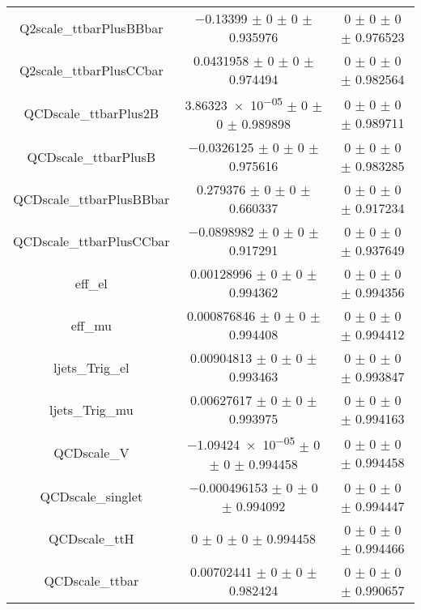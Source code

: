 \begin{table}
\begin{tabular}{ccc}
Q2scale\_ttbarPlusBBbar & \num{-0.13399} $\pm$ \num{0} $\pm$ \num{0} $\pm$ \num{0.935976} & \num{0} $\pm$ \num{0} $\pm$ \num{0} $\pm$ \num{0.976523}\\
Q2scale\_ttbarPlusCCbar & \num{0.0431958} $\pm$ \num{0} $\pm$ \num{0} $\pm$ \num{0.974494} & \num{0} $\pm$ \num{0} $\pm$ \num{0} $\pm$ \num{0.982564}\\
QCDscale\_ttbarPlus2B & \num{3.86323e-05} $\pm$ \num{0} $\pm$ \num{0} $\pm$ \num{0.989898} & \num{0} $\pm$ \num{0} $\pm$ \num{0} $\pm$ \num{0.989711}\\
QCDscale\_ttbarPlusB & \num{-0.0326125} $\pm$ \num{0} $\pm$ \num{0} $\pm$ \num{0.975616} & \num{0} $\pm$ \num{0} $\pm$ \num{0} $\pm$ \num{0.983285}\\
QCDscale\_ttbarPlusBBbar & \num{0.279376} $\pm$ \num{0} $\pm$ \num{0} $\pm$ \num{0.660337} & \num{0} $\pm$ \num{0} $\pm$ \num{0} $\pm$ \num{0.917234}\\
QCDscale\_ttbarPlusCCbar & \num{-0.0898982} $\pm$ \num{0} $\pm$ \num{0} $\pm$ \num{0.917291} & \num{0} $\pm$ \num{0} $\pm$ \num{0} $\pm$ \num{0.937649}\\
eff\_el & \num{0.00128996} $\pm$ \num{0} $\pm$ \num{0} $\pm$ \num{0.994362} & \num{0} $\pm$ \num{0} $\pm$ \num{0} $\pm$ \num{0.994356}\\
eff\_mu & \num{0.000876846} $\pm$ \num{0} $\pm$ \num{0} $\pm$ \num{0.994408} & \num{0} $\pm$ \num{0} $\pm$ \num{0} $\pm$ \num{0.994412}\\
ljets\_Trig\_el & \num{0.00904813} $\pm$ \num{0} $\pm$ \num{0} $\pm$ \num{0.993463} & \num{0} $\pm$ \num{0} $\pm$ \num{0} $\pm$ \num{0.993847}\\
ljets\_Trig\_mu & \num{0.00627617} $\pm$ \num{0} $\pm$ \num{0} $\pm$ \num{0.993975} & \num{0} $\pm$ \num{0} $\pm$ \num{0} $\pm$ \num{0.994163}\\
QCDscale\_V & \num{-1.09424e-05} $\pm$ \num{0} $\pm$ \num{0} $\pm$ \num{0.994458} & \num{0} $\pm$ \num{0} $\pm$ \num{0} $\pm$ \num{0.994458}\\
QCDscale\_singlet & \num{-0.000496153} $\pm$ \num{0} $\pm$ \num{0} $\pm$ \num{0.994092} & \num{0} $\pm$ \num{0} $\pm$ \num{0} $\pm$ \num{0.994447}\\
QCDscale\_ttH & \num{0} $\pm$ \num{0} $\pm$ \num{0} $\pm$ \num{0.994458} & \num{0} $\pm$ \num{0} $\pm$ \num{0} $\pm$ \num{0.994466}\\
QCDscale\_ttbar & \num{0.00702441} $\pm$ \num{0} $\pm$ \num{0} $\pm$ \num{0.982424} & \num{0} $\pm$ \num{0} $\pm$ \num{0} $\pm$ \num{0.990657}\\

\end{tabular}
\end{table}
